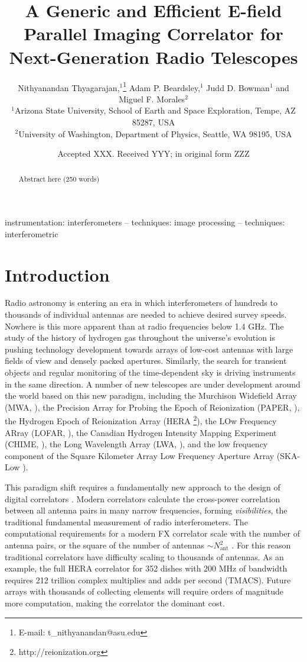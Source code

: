 \documentclass[a4paper,fleqn,usenatbib]{../mnras}
\title[E-field Parallel Imaging Correlator]{A Generic and Efficient E-field Parallel Imaging Correlator for Next-Generation Radio Telescopes}
\author[Thyagarajan et al.]{
Nithyanandan Thyagarajan,$^{1}$\thanks{E-mail: t\_nithyanandan@asu.edu}
Adam P. Beardsley,$^{1}$
Judd D. Bowman$^{1}$
\newauthor
and Miguel F. Morales$^{2}$
\\
$^{1}$Arizona State University, School of Earth and Space Exploration, Tempe, AZ 85287, USA\\
$^{2}$University of Washington, Department of Physics, Seattle, WA 98195, USA\\
}
\date{Accepted XXX. Received YYY; in original form ZZZ}
\newcommand{\Nant}{N_{\text{ant}}}
\begin{document}
\label{firstpage}
\pagerange{\pageref{firstpage}--\pageref{lastpage}}
\maketitle

\begin{abstract}
Abstract here (250 words)
\end{abstract}

\begin{keywords}
instrumentation: interferometers -- techniques: image processing -- techniques: interferometric
\end{keywords}



\section{Introduction}

Radio astronomy is entering an era in which interferometers of hundreds to
thousands of individual antennas are needed to achieve desired survey speeds.
Nowhere is this more apparent than at radio frequencies below 1.4 GHz. The study
of the history of hydrogen gas throughout the universe's evolution is pushing
technology development towards arrays of low-cost antennas with large fields of
view and densely packed apertures. Similarly, the search for transient objects
and regular monitoring of the time-dependent sky is driving instruments in the
same direction. A number of new telescopes are under development around the world
based on this new paradigm, including the Murchison Widefield Array (MWA,
\citealt{tin13}), the Precision Array for Probing the Epoch of Reionization
(PAPER, \citealt{par10}), the Hydrogen Epoch of Reionization Array (HERA
\footnote{http://reionization.org}), the LOw Frequency ARray (LOFAR,
\citealt{dev09}), the Canadian Hydrogen Intensity Mapping Experiment (CHIME,
\citealt{ban14}), the Long Wavelength Array (LWA, \citealt{ell13}), and the low
frequency component of the Square Kilometer Array Low Frequency Aperture Array
(SKA-Low \citealt{mel13}).

This paradigm shift requires a fundamentally new approach to the design of
digital correlators \citep{lon00}. Modern correlators calculate the cross-power
correlation between all antenna pairs in many narrow frequencies, forming
\emph{visibilities}, the traditional fundamental measurement of radio
interferometers. The computational requirements for a modern FX correlator scale
with the number of antenna pairs, or the square of the number of antennas $\sim
\Nant^2$ \citep{bun04}. For this reason traditional correlators have difficulty
scaling to thousands of antennas. As an example, the full HERA correlator for
352 dishes with 200 MHz of bandwidth requires 212 trillion complex multiplies
and adds per second (TMACS). Future arrays with thousands of collecting elements
will require orders of magnitude more computation, making the correlator the
dominant cost.
\end{document}
